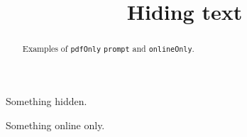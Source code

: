 \documentclass{ximera}
\title[Examples:]{Hiding text}
\begin{document}
\begin{abstract}
  Examples of \texttt{pdfOnly} \texttt{prompt} and
  \texttt{onlineOnly}.
\end{abstract}
\maketitle


\begin{prompt}  
  Something hidden.
\end{prompt}
\begin{onlineOnly}
  Something online only.
\end{onlineOnly}
\end{document}

